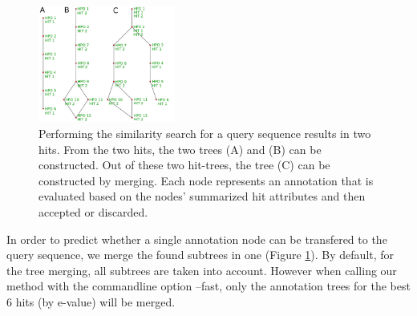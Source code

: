 \begin{figure}[!hb]
\includegraphics[width = 0.4\textwidth]{figures/merge_trees.png}
\caption{Performing the similarity search for a query sequence results in two hits. From the two hits, the two trees (A) and (B) can be constructed. Out of these two hit-trees, the tree (C) can be constructed by merging. Each node represents an annotation that is evaluated based on the nodes' summarized hit attributes and then accepted or discarded.}
\label{fig:function_transfer2}
\end{figure}
In order to predict whether a single annotation node can be transfered to the query sequence, we merge the found subtrees in one (Figure \ref{fig:function_transfer2}). By default, for the tree merging, all subtrees are taken into account. However when calling our method with the commandline option --fast, only the annotation trees for the best 6 hits (by e-value) will be merged.

